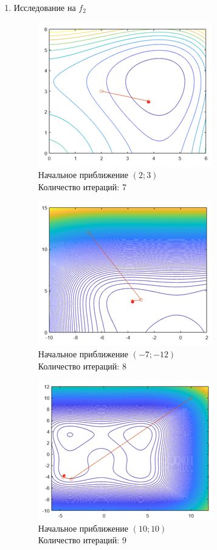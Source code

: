 \documentclass[12pt]{article}
\begin{document}
\begin{enumerate}
	\item Исследование на $f_2$

		\begin{figure}[H]
    	\centering
    	\includegraphics[]{img/f2_2_1.png}
    	\\ Начальное приближение $\left( 2; 3 \right)$
    	\\ Количество итераций: 7
    \end{figure}

	\begin{figure}[H]
    	\centering
    	\includegraphics[]{img/f2_2_2.png}
    	\\ Начальное приближение $\left( -7; -12 \right)$
    	\\ Количество итераций: 8
    \end{figure}

	\begin{figure}[H]
    	\centering
    	\includegraphics[]{img/f2_2_3.png}
    	\\ Начальное приближение $\left( 10; 10 \right)$
    	\\ Количество итераций: 9
    \end{figure}


\end{enumerate}
\end{document}
